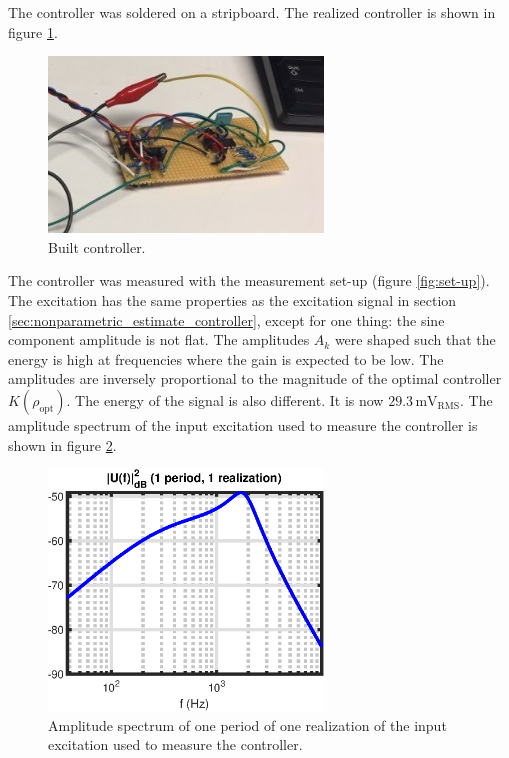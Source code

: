 \newpage
The controller was soldered on a stripboard. The realized controller is shown in figure \ref{fig:controller_real}.

\begin{figure}
\centering
\includegraphics[width = 0.65\textwidth]{figures/controller_real.jpg}
\caption{Built controller.}
\label{fig:controller_real}
\end{figure}


The controller was measured with the measurement set-up (figure \ref{fig:set-up}). The excitation has the same properties as the excitation signal in section \ref{sec:nonparametric_estimate_controller}, except for one thing: the sine component amplitude is not flat. The amplitudes $A_k$ were shaped such that the energy is high at frequencies where the gain is expected to be low. The amplitudes are inversely proportional to the magnitude of the optimal controller $K(\rho_{\mathrm{opt}})$. The energy of the signal is also different. It is now $29.3 \, \mathrm{mV}_\mathrm{RMS}$. The amplitude spectrum of the input excitation used to measure the controller is shown in figure \ref{fig:controller_input_for_meas}.


\begin{figure}[H]
\centering
\includegraphics[width = 0.65\textwidth]{figures/controller_input_for_meas.eps}
\caption{Amplitude spectrum of one period of one realization of the input excitation used to measure the controller.}
\label{fig:controller_input_for_meas}
\end{figure}

